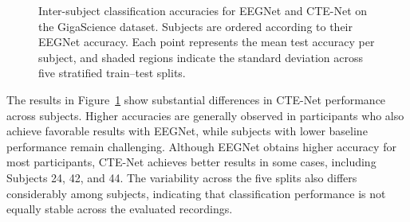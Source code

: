 \begin{figure}[H]
{%
}


\caption{
Inter-subject classification accuracies for EEGNet
and CTE-Net on the GigaScience dataset.
Subjects are ordered according to their EEGNet accuracy.
Each point represents the mean test accuracy per subject,
and shaded regions indicate the standard deviation
across five stratified train--test splits.
}

\label{fig:acc_eegnet_vs_ctenet_giga}

\end{figure}

The results in Figure~\ref{fig:acc_eegnet_vs_ctenet_giga} show substantial differences in CTE-Net performance across subjects. Higher accuracies are generally observed in participants who also achieve favorable results with EEGNet, while subjects with lower baseline performance remain challenging. Although EEGNet obtains higher accuracy for most participants, CTE-Net achieves better results in some cases, including Subjects 24, 42, and 44. The variability across the five splits also differs considerably among subjects, indicating that classification performance is not equally stable across the evaluated recordings.

